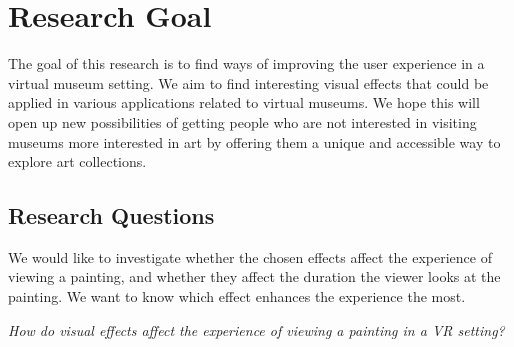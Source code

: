 \documentclass[a4paper]{article}
\begin{document}
\section{Research Goal}
The goal of this research is to find ways of improving the user experience in a virtual museum setting. We aim to find interesting visual effects that could be applied in various applications related to virtual museums. We hope this will open up new possibilities of getting people who are not interested in visiting museums more interested in art by offering them a unique and accessible way to explore art collections.



\subsection {Research Questions}
We would like to investigate whether the chosen effects affect the experience of viewing a painting, and whether they affect the duration the viewer looks at the painting. We want to know which effect enhances the experience the most.

\emph{How do visual effects affect the experience of viewing a painting in a VR setting?}
\end{document}
